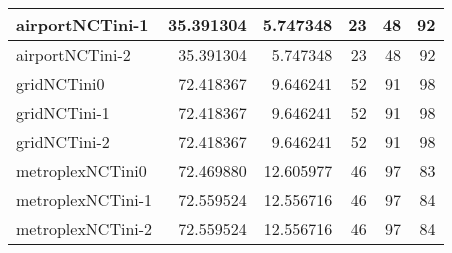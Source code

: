 \begin{longtable}{|l|r|r|r|r|r|}
airportNCTini-1 & 35.391304 & 5.747348 & 23 & 48 & 92 \\ \hline
airportNCTini-2 & 35.391304 & 5.747348 & 23 & 48 & 92 \\ \hline
gridNCTini0 & 72.418367 & 9.646241 & 52 & 91 & 98 \\ \hline
gridNCTini-1 & 72.418367 & 9.646241 & 52 & 91 & 98 \\ \hline
gridNCTini-2 & 72.418367 & 9.646241 & 52 & 91 & 98 \\ \hline
metroplexNCTini0 & 72.469880 & 12.605977 & 46 & 97 & 83 \\ \hline
metroplexNCTini-1 & 72.559524 & 12.556716 & 46 & 97 & 84 \\ \hline
metroplexNCTini-2 & 72.559524 & 12.556716 & 46 & 97 & 84 \\ \hline
\end{longtable}
\ifshowtableLinear
